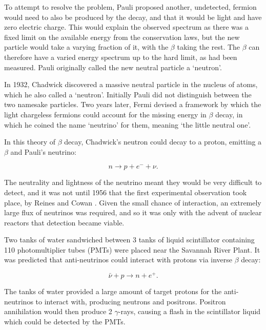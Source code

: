 To attempt to resolve the problem, Pauli \cite{pauli} proposed another, undetected, fermion would need to also be produced by the decay, and that it would be light and have zero electric charge. This would explain the observed spectrum as there was a fixed limit on the available energy from the conservation laws, but the new particle would take a varying fraction of it, with the $\beta$ taking the rest. The $\beta$ can therefore have a varied energy spectrum up to the hard limit, as had been measured. Pauli originally called the new neutral particle a `neutron'.

In 1932, Chadwick discovered a massive neutral particle in the nucleus of atoms, which he also called a `neutron'. Initially Pauli did not distinguish between the two namesake particles. Two years later, Fermi devised a framework by which the light chargeless fermions could account for the missing energy\cite{fermi} in $\beta$ decay, in which he coined the name `neutrino' for them, meaning `the little neutral one'.

In this theory of $\beta$ decay, Chadwick's neutron could decay to a proton, emitting a $\beta$ and Pauli's neutrino:

\begin{equation}
n \rightarrow p + e^- + \nu.
\end{equation}

The neutrality and lightness of the neutrino meant they would be very difficult to detect, and it was not until 1956 that the first experimental observation took place, by Reines and Cowan \cite{cowan}. Given the small chance of interaction, an extremely large flux of neutrinos was required, and so it was only with the advent of nuclear reactors that detection became viable.

Two tanks of water sandwiched between 3 tanks of liquid scintillator containing 110 photomultiplier tubes (PMTs) were placed near the Savannah River Plant. It was predicted that anti-neutrinos could interact with protons via inverse $
\beta$ decay:

\begin{equation}
\bar{\nu} + p \rightarrow n + e^+.
\end{equation}

The tanks of water provided a large amount of target protons for the anti-neutrinos to interact with, producing neutrons and positrons. Positron annihilation would then produce 2 $\gamma$-rays, causing a flash in the scintillator liquid which could be detected by the PMTs.

